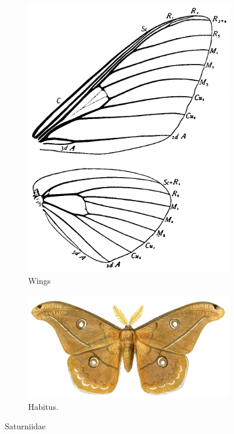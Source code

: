 \documentclass[letterpaper, 11pt]{article}
\begin{document}
\begin{figure}[ht!]
    \centering
    \begin{subfigure}[ht!]{0.31\textwidth}
        \includegraphics[width=\textwidth]{SaturniidWings}%
        \caption{Wings \citep[Fig. 345]{comstock1918wings}}
        \label{fig:saturniid1}
    \end{subfigure}
    \hfill %
    \begin{subfigure}[ht!]{0.6\textwidth}
        \includegraphics[width=\textwidth]{SaturniidHabitus}
        \caption{Habitus. \citep[][Plate 19, Fig. 1]{druce1900biologia}}
        \label{fig:saturniid2}
    \end{subfigure}
    \caption{Saturniidae}\label{fig:saturniids}
\end{figure}
\end{document}
